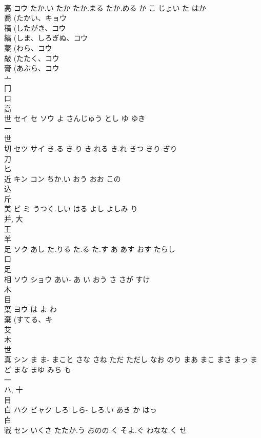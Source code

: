 \documentclass[8pt]{extreport}
\begin{document}
\begin{CJK}{UTF8}{min}
\\	高	コウ	たか.い たか たか.まる たか.める か こ じょい た はか	
\\	喬 (たかい、キョウ 
\\	稿 (したがき、コウ 
\\	縞 (しま、しろぎぬ、コウ 
\\	藁 (わら、コウ 
\\	敲 (たたく、コウ 
\\	膏 (あぶら、コウ 
\\	亠 
\\	冂 
\\	口 
\\	高 
\\	世	セイ セ ソウ	よ さんじゅう とし ゆ ゆき	
\\	一 
\\	世 
\\	切	セツ サイ	き.る き.り き.れる き.れ きつ きり ぎり	
\\	刀 
\\	匕 
\\	近	キン コン	ちか.い おう おお この	
\\	込 
\\	斤 
\\	美	ビ ミ	うつく.しい はる よし よしみ り	
\\	并, 大 
\\	王 
\\	羊 
\\	足	ソク	あし た.りる た.る た.す あ あす おす たらし	
\\	口 
\\	足 
\\	相	ソウ ショウ	あい- あ い おう さ さが すけ	
\\	木 
\\	目 
\\	葉	ヨウ	は よ わ	
\\	棄 (すてる、キ 
\\	艾 
\\	木 
\\	世 
\\	真	シン	ま ま- まこと さな さね ただ ただし なお のり まあ まこ まさ まっ まど まな まゆ みち も	
\\	一 
\\	ハ, 十 
\\	目 
\\	白	ハク ビャク	しろ しら- しろ.い あき か はっ	
\\	白 
\\	戦	セン	いくさ たたか.う おのの.く そよ.ぐ わなな.く せ	

\end{CJK}
\end{document}
